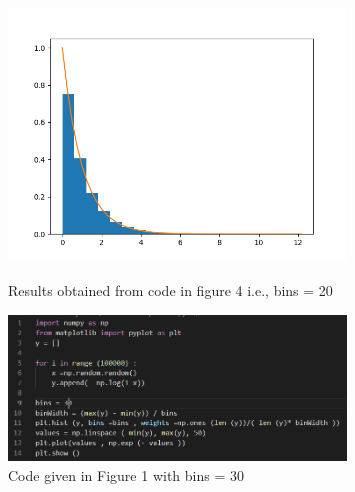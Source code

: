 \documentclass[answers]{exam}
\begin{document}
\begin{framed}
\begin{figure}[H]
    \includegraphics[width= 0.8\textwidth]{Q2.1_bins=20.png}
    \caption{Results obtained from code in figure 4 i.e., bins = 20}
\vspace{1cm} 
    \includegraphics[width= 0.8\textwidth]{Q2.1_bins=30_code.PNG}
    \caption{Code given in Figure 1 with bins = 30}
\end{figure}


\end{framed}
\end{document}
